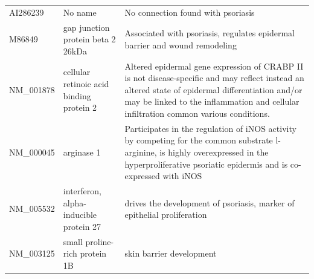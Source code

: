 \documentclass[10pt,a4paper]{article}
\begin{document}
\begin{table}[]
\begin{tabular}{l|p{4.5cm} p{8.5cm}}
		AI286239           &  No name                                                                                                                       &   No connection found with psoriasis                                                                                                                                                                                                                                        \\
		M86849             & gap junction protein beta 2 26kDa                                                                                       & Associated with psoriasis, regulates epidermal barrier and wound remodeling\cite{sun2010association, djalilian2006connexin}                                                                                                                                                               \\
		NM\_001878         & cellular retinoic acid binding protein 2                                                                                & Altered epidermal gene expression of CRABP II is not disease-specific and may reflect instead an altered state of epidermal differentiation and/or may be linked to the inflammation and cellular infiltration common various conditions.\cite{algermissen1996differential} \\
		NM\_000045         & arginase 1                                                                                                              & Participates in the regulation of iNOS activity by competing for the common substrate l-arginine, is highly overexpressed in the hyperproliferative psoriatic epidermis and is co-expressed with iNOS\cite{bruch2003arginase}                                     \\
		NM\_005532         & interferon, alpha-inducible protein 27                                                                                  & drives the development of psoriasis, marker of epithelial proliferation\cite{nestle2005plasmacytoid, suomela2004interferon}                                                                                                                                                                     \\
		NM\_003125         & small proline-rich protein 1B                                                                                           & skin barrier development\cite{bergboer2012genetics}                                                                                                                                                                                                                    \\

\end{tabular}
\end{table}
\end{document}
